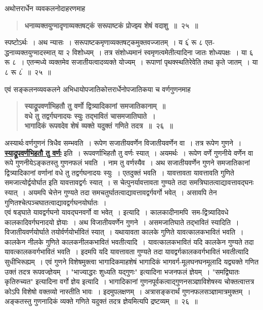 \documentclass[11pt, openany]{book}
\begin{document}
\begin{sloppypar}
{\small अथोत्तरार्धेन व्यवकलनोदाहरणमाह\textendash }

 \label{3.25}
\begin{quote}
{\large \textbf{{\color{purple}धनाव्यक्तयुग्मादृणाव्यक्तषट्कं सरूपाष्टकं प्रोज्झ्य शेषं वदाशु~॥~२५~॥}}}
\end{quote}

स्पष्टोऽर्थः~। अथ न्यासः~। सरूपाष्टकमृणाव्यक्तषट्कमुक्तवज्जातम्~। य ६ं रू ८ एत-द्धनाव्यक्तयुग्मादस्मात् या २ विशोध्यम्~। तत्र संशोध्यमानं स्वमृणत्वमेतीत्यादिना जातः शोध्यपक्षः~। या ६ रू ८~। एतन्मध्ये व्यक्तमेव सजातीयत्वादव्यक्ते योज्यम्~। रूपाणां पृथक्स्थतिरेवेति तथा कृते जातम्~। या ८ रू ८ं~॥~२५~॥
\end{sloppypar}

\newpage

\begin{sloppypar}
{\small एवं सङ्कलनव्यवकलने अभिधायोपजातिकोत्तरार्धेनोपजातिकया च वर्णगुणनमाह\textendash }

 \label{3.26}
\begin{quote}
{\large \textbf{{\color{purple}स्याद्रूपवर्णाभिहतौ तु वर्णो द्वित्र्यादिकानां समजातिकानाम्~॥\\
वधे तु तद्वर्गघनादयः स्युः तद्भावितं चासमजातिघाते~।\\
भागादिकं रूपवदेव शेषं व्यक्ते यदुक्तं गणिते तदत्र~॥~२६~॥}}}
\end{quote}

अस्यार्थः\textendash \,वर्णगुणनं त्रिधैव सम्भवति~। रूपेण सजातीयवर्णेन विजातीयवर्णेन वा~। तत्र रूपेण गुणने~। \hyperref[3.26]{\textbf{स्याद्रूपवर्णभिहतौ तु वर्णः}} इति~। रूपवर्णाभिहतौ तु वर्णः स्यात्~। अयमर्थः~। रूपेण वर्णे गुणनीये वर्णेन वा रूपे गुणनीयेऽङ्कतस्तु गुणनफलं भवति~। नाम तु वर्णस्यैव~। अथ सजातीयवर्णेन गुणने समजातिकानां द्वित्र्यादिकानां वर्णानां वधे तु तद्वर्गघनादयः स्युः~। एतदुक्तं भवति~। यावत्तावता यावत्तावति गुणिते समजात्योर्द्वयोर्घात इति यावत्तावद्वर्गः स्यात्~। स चेत्पुनर्यावत्तावता गुण्यते तदा समत्रिघातत्वाद्यावत्तावद्घनः स्यात्~। अयमपि चेत्तेन गुण्यते तदा समचतुर्घातत्वाद्यावत्तावद्वर्गवर्गो भवेत्~। असावपि तेन गुणितश्चेत्पञ्चघातत्वाद्यावद्वर्गघनयोर्घातः~।\\

एवं षड्घाते यावद्वर्गघनो यावद्घनवर्गो वा भवेत्~। इत्यादि~। कालकादीनामपि~सम-द्वित्र्यादिवधे कालकादिवर्गघनादयो ज्ञेयाः~। अथ विजातीयवर्णेन गुणने~। असमजातिघाते तद्भावितं स्यादिति~। विजातीयवर्णयोर्घाते तयोर्वर्णयोर्भावितं स्यात्~। यथा\textendash \;यावता कालके गुणिते यावत्कालकभावितं भवति~। कालकेन नीलके गुणिते कालकनीलकभावितं भवतीत्यादि~। यावत्कालकभावितं यदि कालकेन गुण्यते तदा यावत्कालकवर्गभावितं भवति~। इदमपि यदि यावत्तावता गुण्यते तदा यावद्वर्गकालकवर्गभावितं भवतीत्यादि सुधीभिरूह्यम्~। एवं गुणने विशेषमुक्त्वा भागादिकमाह\textendash \;शेषं भागादिकं भागवर्ग-मूलघनघनमूलादि यद्व्यक्ते गणित उक्तं तदत्र रूपवज्ज्ञेयम्~। {\color{violet}"भाज्याद्धरः शुध्यति यद्गुणः"} इत्यादिना भजनफलं ज्ञेयम्~। {\color{violet}"समद्विघातः कृतिरुच्यत"} इत्यादिना वर्गो ज्ञेय इत्यादि~। भागादिकानां गुणनपूर्वकत्वाद्गुणनसञ्ज्ञाविशेषस्य चोक्तत्वात्तत्र कोऽपि विशेषो वक्तव्यो नास्तीति भावः~। इदमुपलक्षणम्~। अत्रासङ्करार्थं गुणनफलसञ्ज्ञामात्रमुक्तम्~। अङ्कतस्तु गुणनादिकं व्यक्ते गणिते यदुक्तं तदत्र ज्ञेयमित्यपि द्रष्टव्यम्~॥~२६~॥ \\


\end{sloppypar}
\end{document}
